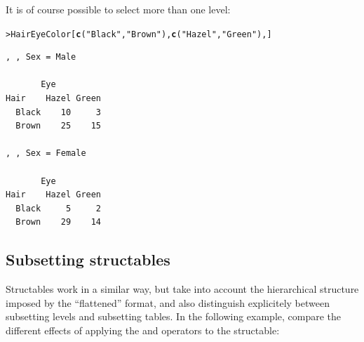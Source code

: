 \documentclass[10pt,krantz2]{krantz}\usepackage[]{graphicx}\usepackage[]{color}
\makeatletter
\newcommand{\hlstr}[1]{\textcolor[rgb]{0.192,0.494,0.8}{#1}}%
\newcommand{\hlstd}[1]{\textcolor[rgb]{0.345,0.345,0.345}{#1}}%
\newcommand{\hlkwd}[1]{\textcolor[rgb]{0.737,0.353,0.396}{\textbf{#1}}}%
\newenvironment{kframe}{%
 \def\at@end@of@kframe{}%
 \ifinner\ifhmode%
  \def\at@end@of@kframe{\end{minipage}}%
  \begin{minipage}{\columnwidth}%
 \fi\fi%
 \def\FrameCommand##1{\hskip\@totalleftmargin \hskip-\fboxsep
 \colorbox{shadecolor}{##1}\hskip-\fboxsep
     \hskip-\linewidth \hskip-\@totalleftmargin \hskip\columnwidth}%
 \MakeFramed {\advance\hsize-\width
   \@totalleftmargin\z@ \linewidth\hsize
   \@setminipage}}%
 {\par\unskip\endMakeFramed%
 \at@end@of@kframe}
\newenvironment{knitrout}{}{} %
\renewenvironment{knitrout}{\small\renewcommand{\baselinestretch}{.85}}{} %
\makeatother
\begin{document}
It is of course possible to select more than one level:

\begin{knitrout}
\color{fgcolor}\begin{kframe}
\begin{alltt}
\hlstd{> }\hlstd{HairEyeColor[}\hlkwd{c}\hlstd{(}\hlstr{"Black"}\hlstd{,} \hlstr{"Brown"}\hlstd{),} \hlkwd{c}\hlstd{(}\hlstr{"Hazel"}\hlstd{,} \hlstr{"Green"}\hlstd{),]}
\end{alltt}
\begin{verbatim}
, , Sex = Male

       Eye
Hair    Hazel Green
  Black    10     3
  Brown    25    15

, , Sex = Female

       Eye
Hair    Hazel Green
  Black     5     2
  Brown    29    14
\end{verbatim}
\end{kframe}
\end{knitrout}

\subsection[Subsetting structables]{Subsetting structables}\label{sec:subsettingtables}

Structables work in a similar way, but take into account the
hierarchical structure imposed by the ``flattened'' format, and also
distinguish explicitely between subsetting levels and subsetting
tables. In the following example, compare the different effects of
applying the \code{[} and \code{[[} operators to the structable: %
\end{document}
